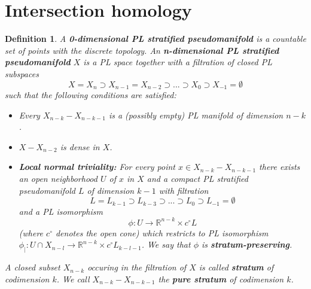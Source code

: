\documentclass{scrreprt}
\newtheorem{definition}[prop]{Definition}
\begin{document}
\section{Intersection homology}

\begin{definition}
A \textbf{0-dimensional PL stratified pseudomanifold} is a countable set of points with the discrete topology. An \textbf{n-dimensional PL stratified pseudomanifold} $X$ is a PL space together with a filtration of closed PL subspaces
\begin{equation*}
X=X_n \supset X_{n-1} = X_{n-2} \supset ... \supset X_0 \supset X_{-1} = \emptyset
\end{equation*}
such that the following conditions are satisfied:
\begin{itemize}
\item Every $X_{n-k} - X_{n-k-1}$ is a (possibly empty) PL manifold of dimension $n-k$.
\item $X-X_{n-2}$ is dense in $X$.
\item \textbf{Local normal triviality:} For every point $x \in X_{n-k} - X_{n-k-1}$ there exists an open neighborhood $U$ of $x$  in $X$ and a compact PL stratified pseudomanifold $L$ of dimension $k-1$ with filtration
\begin{equation*}
L = L_{k-1} \supset L_{k-3} \supset ... \supset L_0 \supset L_{-1}= \emptyset
\end{equation*}
and a PL isomorphism
\begin{equation*}
\phi : U \to \mathbb{R}^{n-k} \times c^{\circ} L
\end{equation*}
(where $c^{\circ}$ denotes the open cone) which restricts to PL isomorphism $\phi_| : U \cap X_{n-l} \to \mathbb{R}^{n-k} \times c^{\circ} L_{k-l-1}$. We say that $\phi$ is \textbf{stratum-preserving}.
\end{itemize}
A closed subset $X_{n-k}$ occuring in the filtration of $X$ is called \textbf{stratum} of codimension $k$. We call $X_{n-k}-X_{n-k-1}$ the \textbf{pure stratum} of codimension $k$.
\end{definition}
\end{document}
